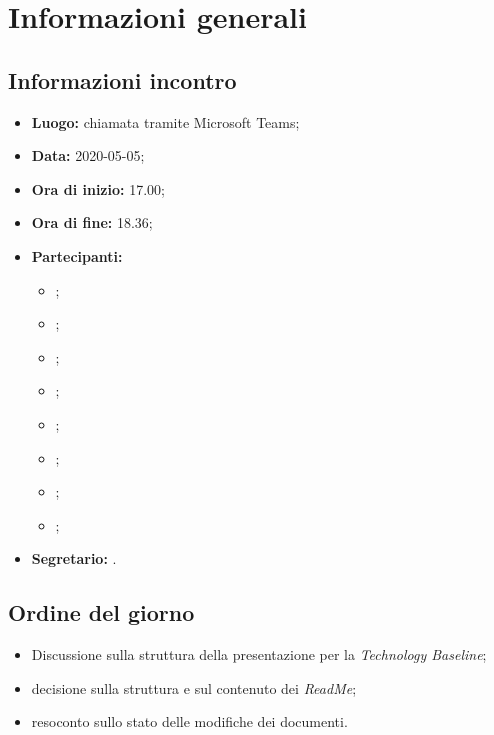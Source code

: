 \section{Informazioni generali}
\subsection{Informazioni incontro}
\begin{itemize}
	\item \textbf{Luogo:} chiamata tramite Microsoft Teams; 
	\item \textbf{Data:} 2020-05-05;
	\item \textbf{Ora di inizio:} 17.00; 
	\item \textbf{Ora di fine:} 18.36; 
	\item \textbf{Partecipanti:}
		\begin{itemize}
			\item \VB; 
			\item \LB; 
			\item \NF; 
			\item \EG; 
			\item \FJ; 
			\item \MP; 
			\item \AS; 
			\item \AZ; 
		\end{itemize}
	\item \textbf{Segretario:} \NF. 
\end{itemize}

\subsection{Ordine del giorno}
\begin{itemize}
	\item{Discussione sulla struttura della presentazione per la \textit{Technology Baseline}};
	\item{decisione sulla struttura e sul contenuto dei \textit{ReadMe};}
	\item{resoconto sullo stato delle modifiche dei documenti.}
\end{itemize}
